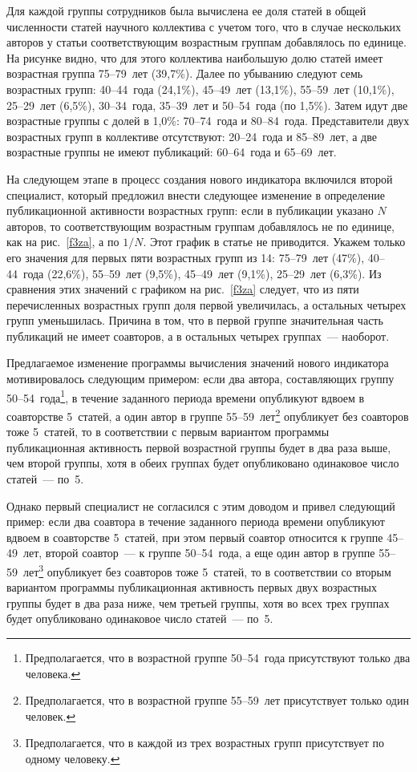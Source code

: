\begin{multicols}{2}
   Для каждой группы сотрудников была вы\-чис\-ле\-на ее доля статей в общей численности
статей научного коллектива с учетом того, что в случае нескольких авторов у статьи
соответствующим возрастным группам добавлялось по единице. На рисунке видно, что для
этого коллектива наибольшую долю статей имеет возрастная группа 75--79~лет (39,7\%).
Далее по убыванию следуют семь возрастных групп: 40--44~года (24,1\%), 45--49~лет
(13,1\%), 55--59~лет (10,1\%), 25--29~лет (6,5\%), 30--34~года, 35--39~лет и 50--54~года (по
1,5\%). Затем идут две возрастные группы с долей в 1,0\%: 70--74~года и 80--84~года.
Представители двух возрастных групп в коллективе отсутствуют: 20--24~года и 85--89~лет, а
две возрастные группы не имеют публикаций: 60--64~года и 65--69~лет.

   На следующем этапе в процесс создания нового индикатора включился второй
специалист, который предложил внести следующее изменение в определение
публикационной активности возрастных групп: если в публикации указано $N$ авторов, то
соответствующим возрастным группам добавлялось не по единице, как на рис.~\ref{f3za}, а
по $1/N$. Этот график в статье не приводится. Укажем только его значения для первых пяти
возрастных групп из 14: 75--79~лет (47\%), 40--44~года (22,6\%), 55--59~лет (9,5\%),
   45--49~лет (9,1\%), 25--29~лет (6,3\%). Из сравнения этих значений с графиком на
рис.~\ref{f3za} следует, что из пяти перечисленных возрастных групп доля первой
увеличилась, а остальных четырех групп уменьшилась. Причина в том, что в первой группе
значительная часть публикаций не имеет соавторов, а в остальных четырех группах~---
наоборот.

   Предлагаемое изменение программы вычисления значений нового индикатора
мотивировалось следующим примером: если два автора, составляющих группу
   50--54~года\footnote{Предполагается, что в возрастной группе 50--54~года присутствуют только два
человека.}, в течение заданного периода времени опубликуют вдвоем в соавторстве 5~статей,
а один автор в группе 55--59~лет\footnote{Предполагается, что в возрастной группе 55--59~лет
присутствует только один человек.} опубликует без соавторов тоже 5~статей, то в соответствии с
первым вариантом программы публикационная активность первой возрастной группы будет
в два раза выше, чем второй группы, хотя в обеих группах будет опубликовано одинаковое
число статей~--- по~5.

   Однако первый специалист не согласился с этим доводом и привел следующий пример:
если два соавтора в течение заданного периода времени опуб\-ли\-ку\-ют вдвоем в соавторстве
5~статей, при этом первый соавтор относится к группе 45--49~лет, второй соавтор~--- к
группе 50--54~года, а еще один автор в группе 55--59~лет\footnote{Предполагается, что в
каждой из трех возрастных групп присутствует по одному человеку.} опубликует без соавторов тоже
5~статей, то в соответствии со вторым вариантом программы публикационная активность
первых двух возрастных группы будет в два раза ниже, чем третьей группы, хотя во всех
трех группах будет опубликовано одинаковое число статей~--- по~5.


\end{multicols}
